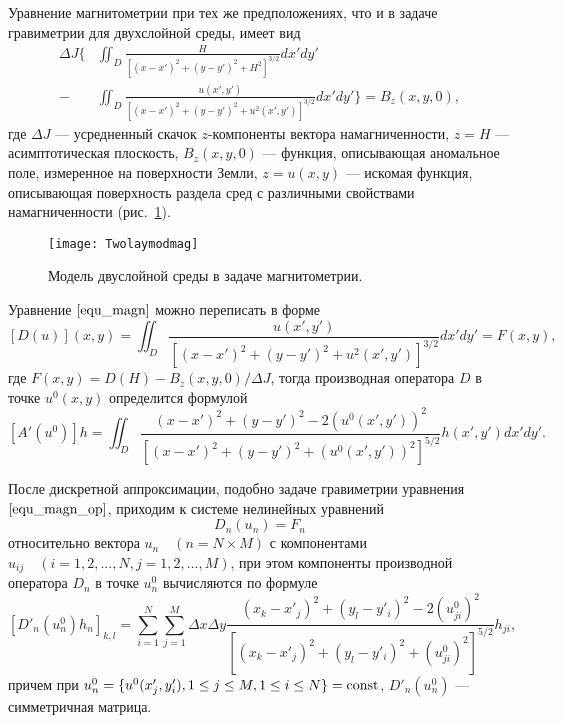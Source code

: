 Уравнение магнитометрии при тех же предположениях, что и в задаче гравиметрии для двухслойной среды, имеет вид
\begin{equation}\label{equ_magn}\begin{aligned}
\Delta J  \bigg\{&\iint_{D} \frac{H}{[(x-x')^2+(y-y')^2+H^2]^{3/2}}dx'dy' \\
- &\iint_{D} \frac{u(x',y')}{[(x-x')^2+(y-y')^2+u^2(x',y')]^{3/2}}dx'dy' \bigg\}=B_z(x,y,0),
\end{aligned} \end{equation}
где $\Delta J$ --- усредненный скачок $z$-компоненты вектора намагниченности, $z=H$ --- асимптотическая плоскость, $B_z(x,y,0)$ --- функция, описывающая аномальное поле, измеренное на поверхности Земли, $z=u(x,y)$ --- искомая функция, описывающая поверхность раздела сред с различными свойствами намагниченности (рис.~\ref{fig:twolayermag}). 
\begin{figure}[H]
	\centering
	\texttt{[image: Twolaymodmag]}
	\caption{Модель двуслойной среды в задаче магнитометрии.}
	\label{fig:twolayermag}
\end{figure}
Уравнение $\eqref{equ_magn}$ можно переписать в форме
\begin{equation}\label{equ_magn_op}
[D(u)](x,y)= \iint_{D} \frac{u(x',y')}{[(x-x')^2+(y-y')^2+u^2(x',y')]^{3/2}}dx'dy'=F(x,y),
\end{equation}
где $F(x,y)=D(H)-B_z(x,y,0)/\Delta J$, тогда производная оператора $D$ в точке $u^0(x,y)$ определится формулой
$$ [A'(u^0)]h=\iint_{D} \frac{(x-x')^2+(y-y')^2-2(u^0(x',y'))^2}{[(x-x')^2+(y-y')^2+(u^0(x',y'))^2]^{5/2}}h(x',y')dx'dy'. $$

После дискретной аппроксимации, подобно задаче гравиметрии уравнения $\eqref{equ_magn_op}$, приходим к системе нелинейных уравнений
\begin{equation}\label{equ_snle_mag}
D_n(u_n)=F_n
\end{equation}
относительно вектора $u_n \quad (n=N\times M)$ с компонентами $u_{ij}\quad (i=1,2,...,N, j=1,2,...,M)$, при этом компоненты производной оператора $D_n$ в точке $u_{n}^{0}$ вычисляются по формуле
\begin{equation}\label{deriv_op_mag}
[D'_n(u_{n}^{0})h_n]_{k,l}=\sum\limits_{i=1}^{N}\sum\limits_{j=1}^{M}
\Delta x\Delta y\frac{(x_k-x'_j)^2+(y_l-y'_i)^2-2(u_{ji}^0)^2}{[(x_k-x'_j)^2+(y_l-y'_i)^2+(u_{ji}^0)^2]^{5/2}}h_{ji}, 
\end{equation}
причем при $u_{n}^{0}=\{u^0(x'_j, y'_i), 1\le j\le M, 1\le i\le N\}=\textnormal{const}$, $D'_n(u_n^0)$ --- симметричная матрица.

